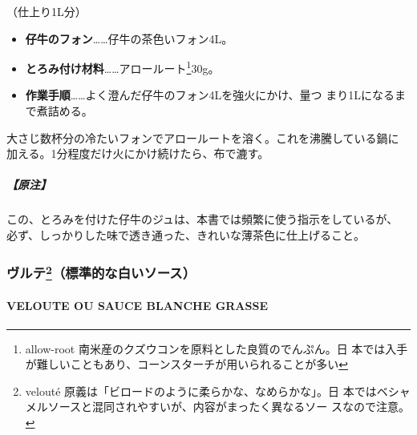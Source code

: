 \begin{recette}
 
  

（仕上り1L分）

\begin{itemize}
\item
  \textbf{仔牛のフォン}\ldots{}\ldots{}仔牛の茶色いフォン4L。
\item
  \textbf{とろみ付け材料}\ldots{}\ldots{}アロールート\footnote{allow-root
    南米産のクズウコンを原料とした良質のでんぷん。日
    本では入手が難しいこともあり、コーンスターチが用いられることが多い}30g。
\item
  \textbf{作業手順}\ldots{}\ldots{}よく澄んだ仔牛のフォン4Lを強火にかけ、\unquart{}量つ
  まり1Lになるまで煮詰める。
\end{itemize}

大さじ数杯分の冷たいフォンでアロールートを溶く。これを沸騰している鍋に
加える。1分程度だけ火にかけ続けたら、布で漉す。

\hypertarget{ux539fux6ce8-2}{%
\subparagraph{【原注】}\label{ux539fux6ce8-2}}

この、とろみを付けた仔牛のジュは、本書では頻繁に使う指示をしているが、
必ず、しっかりした味で透き通った、きれいな薄茶色に仕上げること。

\maeaki

\hypertarget{ux30f4ux30ebux30c6102013ux6a19ux6e96ux7684ux306aux767dux3044ux30bdux30fcux30b9}{%
\subsubsection[ヴルテ（標準的な白いソース）]{\texorpdfstring{ヴルテ\footnote{velouté
  原義は「ビロードのように柔らかな、なめらかな」。日
  本ではベシャメルソースと混同されやすいが、内容がまったく異なるソー
  スなので注意。}（標準的な白いソース）}{ヴルテ（標準的な白いソース）}}\label{ux30f4ux30ebux30c6102013ux6a19ux6e96ux7684ux306aux767dux3044ux30bdux30fcux30b9}}

\hypertarget{veloute}{%
\paragraph{VELOUTE OU SAUCE BLANCHE GRASSE}\label{veloute}}


\end{recette}
